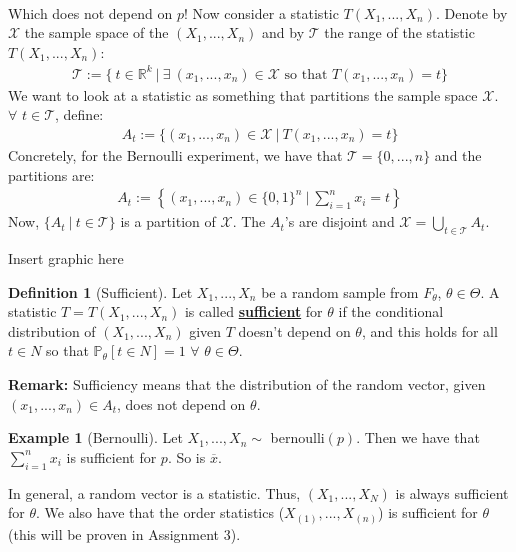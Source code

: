 \documentclass[11pt]{scrartcl}
\newcommand{\R}[0]{\mathbb{R}}
\theoremstyle{definition}
\newtheorem{definition}{Definition}
\newtheorem{ex}{Example}
\theoremstyle{remark}
\newcommand{\dfn}[1]{\textbf{\underline{#1}}}
\newcommand{\stat}[0]{T(X_1, ..., X_n )}
\begin{document}
{\begin{align*}
\end{align*}
Which does not depend on $p$! Now consider a statistic $\stat$. Denote by $\mathcal{X}$ the sample space of the $(X_1, ..., X_n)$ and by $\mathcal{T}$ the range of the statistic $\stat$: 
\begin{align*}
	\mathcal{T} := \{\ t \in \R^k\ |\ \exists\ (x_1, ..., x_n) \in \mathcal{X} \text{ so that } T(x_1, ..., x_n) = t \}  
\end{align*}
We want to look at a statistic as something that partitions the sample space $\mathcal{X}$. $\forall$ $t \in \mathcal{T}$, define: 
\begin{align*}
	A_t := \{ (x_1, ..., x_n) \in \mathcal{X}\ |\ T(x_1, ..., x_n) = t \} 
\end{align*}
Concretely, for the Bernoulli experiment, we have that $\mathcal{T} = \{ 0, ..., n \}$ and the partitions are: 
\begin{align*}
	A_t := \left\{ (x_1, ..., x_n) \in \{ 0,1 \}^n\ |\ \sum_{i=1}^n x_i = t \right\} 
\end{align*}
Now, $\{ A_t\ |\ t \in \mathcal{T} \}$ is a partition of $\mathcal{X}$. The $A_t$'s are disjoint and $\mathcal{X} = \bigcup_{t \in \mathcal{T}} A_t$. 

Insert graphic here

\begin{definition}[Sufficient]
	Let $X_1, ..., X_n$ be a random sample from $F_\theta$, $\theta \in \Theta$. A statistic $T= \stat$ is called \dfn{sufficient} for $\theta$ if the conditional distribution of $(X_1, ..., X_n)$ given $T$ doesn't depend on $\theta$, and this holds for all $ t \in N$ so that $\mathbb{P}_\theta [ t \in N ] =1$ $\forall$ $\theta \in \Theta$. 
\end{definition}

\textbf{Remark:} Sufficiency means that the distribution of the random vector, given $(x_1, ..., x_n) \in A_t$, does not depend on $\theta$.

\begin{ex}[Bernoulli]
	Let $X_1, ..., X_n \sim$ bernoulli$(p)$. Then we have that $\sum_{i=1}^n x_i$ is sufficient for $p$. So is $\overline{x}$. 
\end{ex}

In general, a random vector is a statistic. Thus, $(X_1, ..., X_N)$ is always sufficient for $\theta$. We also have that the order statistics ($X_{(1)}, ..., X_{(n)}$) is sufficient for $\theta$ (this will be proven in Assignment 3). 

}
\end{document}
